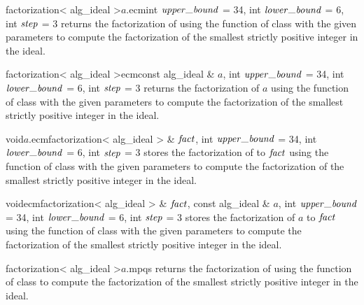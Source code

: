 
\begin{cfcode}{factorization< alg_ideal >}{$a$.ecm}{int $\upperbound$ = 34,
    int $\lowerbound$ = 6, int $\mathit{step}$ = 3}%
  returns the factorization of  using the function  of class
   with the given parameters to compute the factorization of the
  smallest strictly positive integer in the ideal.
\end{cfcode}

\begin{fcode}{factorization< alg_ideal >}{ecm}{const alg_ideal & $a$,
    int $\upperbound$ = 34, int $\lowerbound$ = 6, int $\mathit{step}$ = 3}%
  returns the factorization of $a$ using the function  of class
   with the given parameters to compute the factorization of the
  smallest strictly positive integer in the ideal.
\end{fcode}

\begin{cfcode}{void}{$a$.ecm}{factorization< alg_ideal > & $\mathit{fact}$,
    int $\upperbound$ = 34, int $\lowerbound$ = 6, int $\mathit{step}$ = 3}%
  stores the factorization of  to $\mathit{fact}$ using the function  of
  class  with the given parameters to compute the factorization of
  the smallest strictly positive integer in the ideal.
\end{cfcode}

\begin{fcode}{void}{ecm}{factorization< alg_ideal > & $\mathit{fact}$,
    const alg_ideal & $a$, int $\upperbound$ = 34, int $\lowerbound$ = 6, int $\mathit{step}$ = 3}%
  stores the factorization of $a$ to $\mathit{fact}$ using the function  of class
   with the given parameters to compute the factorization of the
  smallest strictly positive integer in the ideal.
\end{fcode}



\begin{cfcode}{factorization< alg_ideal >}{$a$.mpqs}{}
  returns the factorization of  using the function  of class
   to compute the factorization of the smallest strictly positive
  integer in the ideal.
\end{cfcode}

